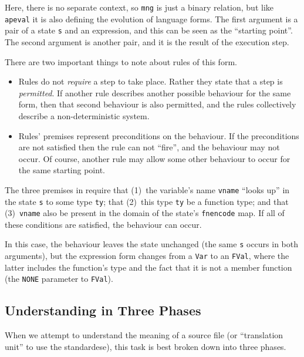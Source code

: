 \documentclass[11pt]{article}
\begin{document}
Here, there is no separate context, so \texttt{mng} is just a binary
relation, but like \texttt{apeval} it is also defining the evolution
of language forms.  The first argument is a pair of a state \texttt{s}
and an expression, and this can be seen as the ``starting point''.  The
second argument is another pair, and it is the result of the execution
step.

There are two important things to note about rules of this form.
\begin{itemize}
\item Rules do not \emph{require} a step to take place.  Rather they
  state that a step is \emph{permitted}.  If another rule describes
  another possible behaviour for the same form, then that second
  behaviour is also permitted, and the rules collectively describe a
  non-deterministic system.
\item Rules' premises represent preconditions on the behaviour.  If
  the preconditions are not satisfied then the rule can not ``fire'',
  and the behaviour may not occur.  Of course, another rule may allow
  some other behaviour to occur for the same starting point.
\end{itemize}

The three premises in  require that (1)~the
variable's name \texttt{vname} ``looks up'' in the state \texttt{s} to
some type \texttt{ty}; that (2)~this type \texttt{ty} be a function
type; and that (3)~\texttt{vname} also be present in the domain of the
state's \texttt{fnencode} map.  If all of these conditions are
satisfied, the behaviour can occur.

In this case, the behaviour leaves the state unchanged (the same
\texttt{s} occurs in both arguments), but the expression form changes
from a \texttt{Var} to an \texttt{FVal}, where the latter includes the
function's type and the fact that it is not a member function (the
\texttt{NONE} parameter to \texttt{FVal}).



\subsection{Understanding \cpp{} in Three Phases}
\label{sec:intro-three-phases}

When we attempt to understand the meaning of a \cpp{} source file (or
``translation unit'' to use the standardese), this task is best broken
down into three phases.
\end{document}

